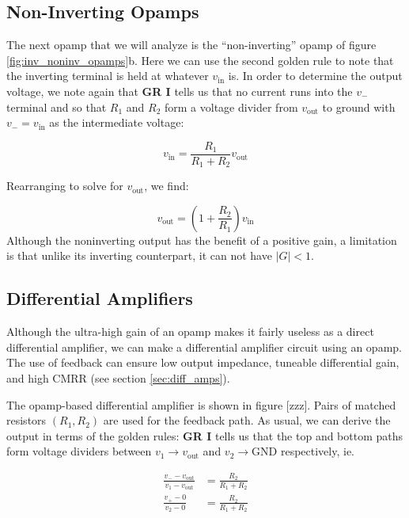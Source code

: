 \documentclass{tufte-book}
\begin{document}
\subsection{Non-Inverting Opamps}
The next opamp that we will analyze is the ``non-inverting'' opamp of figure \ref{fig:inv_noninv_opamps}b. Here we can use the second golden rule to note that the inverting terminal is held at whatever $v_\text{in}$ is. In order to determine the output voltage, we note again that \textbf{GR I} tells us that no current runs into the $v_-$ terminal and so that $R_1$ and $R_2$ form a voltage divider from $v_\text{out}$ to ground with $v_- = v_\text{in}$ as the intermediate voltage:

\begin{equation}
\label{eq:noninverting_opamp_deriv_1}
v_\text{in} = \frac{R_1}{R_1 + R_2}v_\text{out}
\end{equation}

Rearranging to solve for $v_\text{out}$, we find: 

\begin{equation}
\label{eq:noninverting_opamp}
v_\text{out} = \left(1+\frac{R_2}{R_1}\right)v_\text{in}
\end{equation}
Although the noninverting output has the benefit of a positive gain, a limitation is that unlike its inverting counterpart, it can not have $\vert G\vert < 1$.

\subsection{Differential Amplifiers}
Although the ultra-high gain of an opamp makes it fairly useless as a direct differential amplifier, we can make a differential amplifier circuit using an opamp. The use of feedback can ensure low output impedance, tuneable differential gain, and high CMRR (see section \ref{sec:diff_amps}).

The opamp-based differential amplifier is shown in figure [zzz]. Pairs of matched resistors $\left(R_1,R_2\right)$ are used for the feedback path. As usual, we can derive the output in terms of the golden rules: \textbf{GR I} tells us that the top and bottom paths form voltage dividers between $v_1\rightarrow v_\text{out}$ and $v_2\rightarrow \text{GND}$ respectively, ie.

\begin{align*}
\frac{v_--v_\text{out}}{v_1-v_\text{out}} &= \frac{R_2}{R_1+R_2} \\
\frac{v_+-0}{v_2-0} &= \frac{R_2}{R_1+R_2} 
\end{align*}
\end{document}
